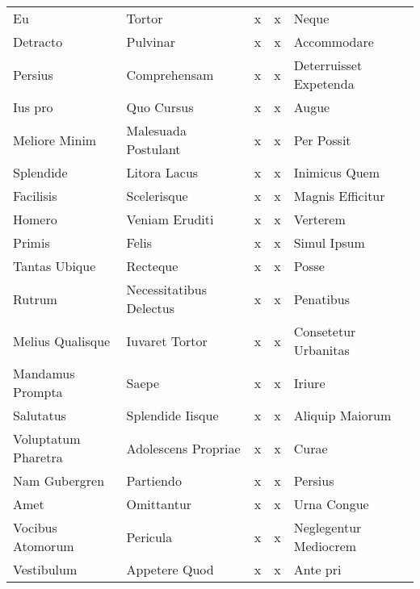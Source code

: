 \documentclass[a4paper]{article}
\begin{document}
\begin{longtable}{p{40mm}p{20mm}rrp{40mm}}
        Eu & Tortor & x & x & Neque\\

        Detracto & Pulvinar & x & x & Accommodare\\

        Persius & Comprehensam & x & x & Deterruisset Expetenda\\

        Ius pro & Quo Cursus & x & x & Augue\\

        Meliore Minim & Malesuada Postulant & x & x & Per Possit\\

        Splendide & Litora Lacus & x & x & Inimicus Quem\\

        Facilisis & Scelerisque & x & x & Magnis Efficitur\\

        Homero & Veniam Eruditi & x & x & Verterem\\

        Primis & Felis & x & x & Simul Ipsum\\

        Tantas Ubique & Recteque & x & x & Posse\\

        Rutrum & Necessitatibus Delectus & x & x & Penatibus\\

        Melius Qualisque & Iuvaret Tortor & x & x & Consetetur Urbanitas\\

        Mandamus Prompta & Saepe & x & x & Iriure\\

        Salutatus & Splendide Iisque & x & x & Aliquip Maiorum\\

        Voluptatum Pharetra & Adolescens Propriae & x & x & Curae\\

        Nam Gubergren & Partiendo & x & x & Persius\\

        Amet & Omittantur & x & x & Urna Congue\\

        Vocibus Atomorum & Pericula & x & x & Neglegentur Mediocrem\\

        Vestibulum & Appetere Quod & x & x & Ante pri\\


\end{longtable}
\end{document}
